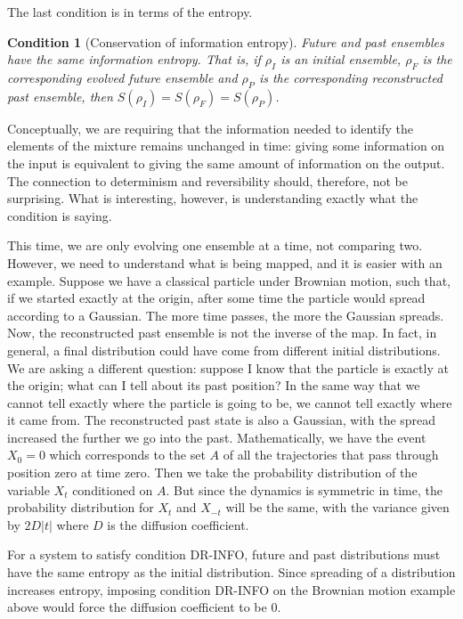 \documentclass[entropy,article,submit,moreauthors]{Definitions/mdpi}
\newtheorem{condth}{Condition}
\renewcommand*{\thecondth}{\Roman{condth}}
\newenvironment{condition}[2][]{\renewcommand{\thecondth}{#2}\begin{condth}[#1]\label{#2}}{\end{condth}\renewcommand{\thecondth}{\Roman{condth}}}
\begin{document}
The last condition is in terms of the entropy.
\begin{condition}[Conservation of information entropy]{DR-INFO}
	Future and past ensembles have the same information entropy. That is, if $\rho_I$ is an initial ensemble, $\rho_F$ is the corresponding evolved future ensemble and $\rho_P$ is the corresponding reconstructed past ensemble, then $S(\rho_I) = S(\rho_F) = S(\rho_P)$.
\end{condition}
Conceptually, we are requiring that the information needed to identify the elements of the mixture remains unchanged in time: giving some information on the input is equivalent to giving the same amount of information on the output. The connection to determinism and reversibility should, therefore, not be surprising. What is interesting, however, is understanding exactly what the condition is saying.

This time, we are only evolving one ensemble at a time, not comparing two. However, we need to understand what is being mapped, and it is easier with an example. Suppose we have a classical particle under Brownian motion, such that, if we started exactly at the origin, after some time the particle would spread according to a Gaussian. The more time passes, the more the Gaussian spreads. Now, the reconstructed past ensemble is not the inverse of the map. In fact, in general, a final distribution could have come from different initial distributions. We are asking a different question: suppose I know that the particle is exactly at the origin; what can I tell about its past position? In the same way that we cannot tell exactly where the particle is going to be, we cannot tell exactly where it came from. The reconstructed past state is also a Gaussian, with the spread increased the further we go into the past. Mathematically, we have the event $X_0 = 0$ which corresponds to the set $A$ of all the trajectories that pass through position zero at time zero. Then we take the probability distribution of the variable $X_t$ conditioned on $A$. But since the dynamics is symmetric in time, the probability distribution for $X_t$ and $X_{-t}$ will be the same, with the variance given by $2D|t|$ where $D$ is the diffusion coefficient.

For a system to satisfy condition DR-INFO, future and past distributions must have the same entropy as the initial distribution.  Since spreading of a distribution increases entropy, imposing condition DR-INFO on the Brownian motion example above would force the diffusion coefficient to be $0$.
\end{document}
